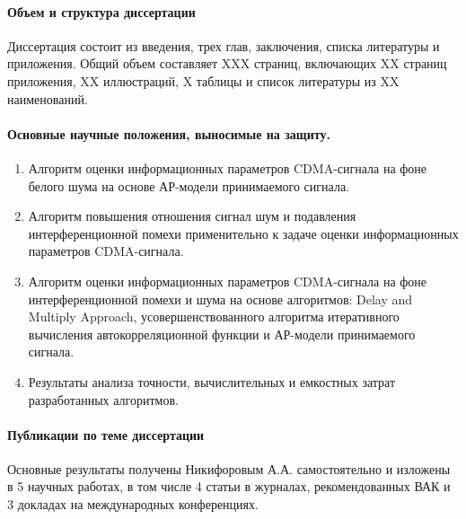 \paragraph{Объем и структура диссертации}
Диссертация состоит из введения, трех глав, заключения, списка литературы и приложения. Общий объем составляет XXX страниц, включающих XX страниц приложения, XX иллюстраций,
X таблицы и список литературы из XX наименований.

\paragraph{Основные научные положения, выносимые на защиту.}
\begin{enumerate}
	\item {Алгоритм оценки информационных параметров CDMA-сигнала на фоне белого шума на основе АР-модели принимаемого сигнала.}
	\item {Алгоритм повышения отношения сигнал шум и подавления интерференционной помехи применительно к задаче оценки информационных параметров CDMA-сигнала.}
	\item {Алгоритм оценки информационных параметров CDMA-сигнала на фоне интерференционной помехи и шума на основе алгоритмов: Delay and Multiply Approach,
		усовершенствованного алгоритма итеративного вычисления автокорреляционной функции и АР-модели принимаемого сигнала.}
	\item {Результаты анализа точности, вычислительных и емкостных затрат разработанных алгоритмов.}
\end{enumerate}

\paragraph{Публикации по теме диссертации}
Основные результаты получены Никифоровым А.А. самостоятельно и изложены в 5 научных работах, в том числе 4 статьи в журналах, рекомендованных ВАК и
3 докладах на международных конференциях.


%


